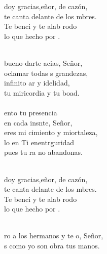 \begin{cancion}%
	\begin{chorus}%
	 doy gracias,eñor, de cazón,\\
	te canta delante de los mbres. \\
	Te benci y te alab rodo \\
	lo que  hecho por . \\
	\end{chorus}%
	\jump\\
	 bueno darte acias, Señor,\\
	oclamar todas s grandezas,\\
	 infinito ar y idelidad,\\
	tu miricordia y tu boad.\\
\jump\\
	ento tu presencia \\
	en cada insnte, Señor,\\
	eres mi cimiento y miortaleza,\\
	lo en Ti enentrguridad\\
	pues tu ra no abandonas. \\\jump\\
	\begin{chorus}%
	 doy gracias,eñor, de cazón,\\
	te canta delante de los mbres. \\
	Te benci y te alab rodo \\
	lo que  hecho por . \\
	\end{chorus}%
	\jump\\
	ro a los hermanos y te o, Señor,\\
	s como yo son obra  tus manos.\\

\end{cancion}
